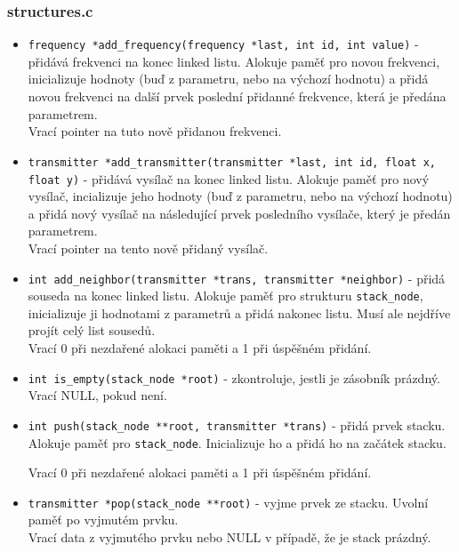 \documentclass[12pt]{article}
\begin{document}
\subsubsection{structures.c}
%
\begin{itemize}
	\item \texttt{frequency *add\_frequency(frequency *last, int id,
		int value)} - přidává frekvenci na konec linked listu. Alokuje
		paměť pro novou frekvenci, inicializuje hodnoty (buď z
		parametru, nebo na výchozí hodnotu) a přidá novou
		frekvenci na další prvek poslední přidanné frekvence, která je
		předána parametrem.\\

		Vrací pointer na tuto nově přidanou frekvenci.
	\item \texttt{transmitter *add\_transmitter(transmitter *last, int id,
		float x, float y)} - přidává vysílač na konec linked listu.
		Alokuje paměť pro nový vysílač, incializuje jeho hodnoty (buď 
		z parametru, nebo na výchozí hodnotu) a přidá nový vysílač na
		následující prvek posledního vysílače, který je předán
		parametrem.\\

		Vrací pointer na tento nově přidaný vysílač.
	\item \texttt{int add\_neighbor(transmitter *trans,
		transmitter *neighbor)} - přidá souseda na konec linked listu.
		Alokuje paměť pro strukturu \texttt{stack\_node}, inicializuje
		ji hodnotami z parametrů a přidá nakonec listu. Musí ale 
		nejdříve projít celý list sousedů.\\

		Vrací 0 při nezdařené alokaci paměti a 1 při úspěšném přidání.
	\item \texttt{int is\_empty(stack\_node *root)} - zkontroluje, jestli
		je zásobník prázdný.\\

		Vrací NULL, pokud není.
	\item \texttt{int push(stack\_node **root, transmitter *trans)} - přidá
		prvek stacku. Alokuje paměť pro \texttt{stack\_node}. 
		Inicializuje ho a přidá ho na začátek stacku.

		Vrací 0 při nezdařené alokaci paměti a 1 při úspěšném přidání.
	\item \texttt{transmitter *pop(stack\_node **root)} - vyjme prvek ze 
		stacku. Uvolní paměť po vyjmutém prvku.\\

		Vrací data z vyjmutého prvku nebo NULL v případě, že je stack
		prázdný.
\end{itemize}
%
\end{document}
